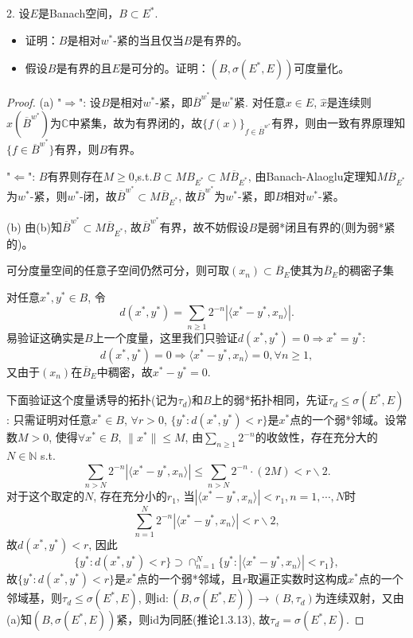 \documentclass[a4paper,8pt]{ctexart}\textwidth 140mm \textheight 216mm
\newcommand{\8}{\infty}
\newcommand{\la}{\langle}
\newcommand{\ra}{\rangle}
\newcommand{\RA}{\Rightarrow}
\newcommand{\LA}{\Leftarrow}
\begin{document}
2. 设$E$是Banach空间，$B\subset E^*$.
\begin{itemize}
	\item[(a)] 证明：$B$是相对$w^*$-紧的当且仅当$B$是有界的。
	\item[(b)] 假设$B$是有界的且$E$是可分的。证明：$(B,\sigma(E^*,E))$可度量化。
\end{itemize}
\begin{proof}
	(a) "$\RA$": 设$B$是相对$w^*$-紧，即$\overline{B}^{w^*}$是$w^*$紧. 对任意$x\in E$, $\hat{x}$是连续则$\hat{x}(\overline{B}^{w^*})$为$\mathbb{C}$中紧集，故为有界闭的，故$\{f(x)\}_{f\in\overline{B}^{w^*}}$有界，则由一致有界原理知$\{f\in\overline{B}^{w^*}\}$有界，则$B$有界。
	
	"$\LA$": $B$有界则存在$M\geq 0$,s.t.$B\subset MB_{E^*}\subset M\overline{B}_{E^*}$, 由Banach-Alaoglu定理知$M\overline{B}_{E^*}$为$w^*$-紧，则$w^*$-闭，故$\overline{B}^{w^*}\subset M\overline{B}_{E^*}$,  故$\overline{B}^{w^*}$为$w^*$-紧，即$B$相对$w^*$-紧。	
	
	(b) 由(b)知$\overline{B}^{w^*}\subset M\overline{B}_{E^*}$, 故$\overline{B}^{w^*}$有界，故不妨假设$B$是弱*闭且有界的(则为弱*紧的)。
	
	可分度量空间的任意子空间仍然可分，则可取$(x_n)\subset \overline{B}_E$使其为$\overline{B}_E$的稠密子集
	
	对任意$x^*,y^*\in B$, 令
	\[d(x^*,y^*)=\sum_{n\geq 1}2^{-n}|\la x^*-y^*,x_n\ra|.\]
	易验证这确实是$B$上一个度量，这里我们只验证$d(x^*,y^*)=0\RA x^*=y^*$:
	\[d(x^*,y^*)=0\RA \la x^*-y^*,x_n\ra=0,\forall n\geq 1,\]
	又由于$(x_n)$在$\overline{B}_E$中稠密，故$x^*-y^*=0$.
	
	下面验证这个度量诱导的拓扑(记为$\tau_d$)和$B$上的弱*拓扑相同，先证$\tau_d\leq \sigma(E^*,E)$: 只需证明对任意$x^*\in B$, $\forall r>0$, $\{y^*:d(x^*,y^*)<r\}$是$x^*$点的一个弱*邻域。设常数$M>0$, 使得$\forall x^*\in B$, $\|x^*\|\leq M$, 由$\sum_{n\geq 1}2^{-n}$的收敛性，存在充分大的$N\in \mathbb{N}$ s.t. 
	\[\sum_{n>N}2^{-n}|\la x^*-y^*,x_n\ra|\leq \sum_{n> N}2^{-n}\cdot(2M) <r\backslash 2.\]
	对于这个取定的$N$, 存在充分小的$r_1$, 当$|\la x^*-y^*,x_n\ra|<r_1, n=1,\cdots,N$时
	\[\sum_{n=1}^N2^{-n}|\la x^*-y^*,x_n\ra|<r\backslash 2,\]
	故$d(x^*,y^*)<r$, 因此
	\[\{y^*:d(x^*,y^*)<r\}\supset \cap_{n=1}^N\{y^*:|\la x^*-y^*,x_n\ra|<r_1\},\]
	故$\{y^*:d(x^*,y^*)<r\}$是$x^*$点的一个弱*邻域，且$r$取遍正实数时这构成$x^*$点的一个邻域基，则$\tau_d\leq \sigma(E^*,E)$, 则$\mathrm{id}:(B,\sigma(E^*,E))\to (B,\tau_d)$为连续双射，又由(a)知$(B,\sigma(E^*,E))$紧，则$\mathrm{id}$为同胚(推论1.3.13), 故$\tau_d=\sigma(E^*,E)$.
\end{proof}
\end{document}

